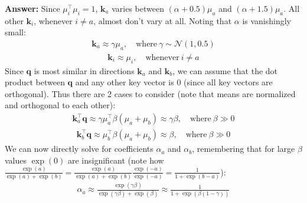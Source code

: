 \documentclass[letterpaper,12pt]{article}
\begin{document}
\begin{itemize}
		\textcolor{blue!70}{\textbf{Answer:} Since $\mu_i^\top\mu_i = 1$, $\mathbf{k}_a$ varies between $(\alpha + 0.5)\mu_a$ and $(\alpha + 1.5)\mu_a$. All other $\mathbf{k}_i$, whenever $i \neq a$, almost don't vary at all. Noting that $\alpha$ is vanishingly small:
		\begin{equation*}
			\begin{aligned}
				\mathbf{k}_a \approx \gamma \mu_a, \quad \text{where} \ \gamma \sim \mathcal{N}(1,0.5)
			\end{aligned}
		\end{equation*}
		\begin{equation*}
			\begin{aligned}
				\mathbf{k}_i \approx \mu_i, \quad \text{whenever} \ i \neq a
			\end{aligned}
		\end{equation*}
		Since $\mathbf{q}$ is most similar in directions $\mathbf{k}_a$ and $\mathbf{k}_b$, we can assume that the dot product between $\mathbf{q}$ and any other key vector is 0 (since all key vectors are orthogonal). Thus there are 2 cases to consider (note that means are normalized and orthogonal to each other):
		\begin{equation*}
			\begin{aligned}
				\mathbf{k}_a^\top \mathbf{q} \approx \gamma \mu_a^\top \beta \left( \mu_a + \mu_b \right) \approx \gamma \beta, \quad \text{where} \ \beta \gg 0
			\end{aligned}
		\end{equation*}
		\begin{equation*}
			\begin{aligned}
				\mathbf{k}_b^\top \mathbf{q} \approx \mu_b^\top \beta \left( \mu_a + \mu_b \right) \approx \beta, \quad \text{where} \ \beta \gg 0
			\end{aligned}
		\end{equation*}
		We can now directly solve for coefficients $\alpha_a$ and $\alpha_b$, remembering that for large $\beta$ values $\exp(0)$ are insignificant (note how $\frac{\exp(a)}{\exp(a)+\exp(b)} = \frac{\exp(a)}{\exp(a)+\exp(b)}\frac{\exp(-a)}{\exp(-a)}=\frac{1}{1+\exp(b-a)}$):
		\begin{equation*}
			\begin{aligned}
				\alpha_a \approx \frac{\exp(\gamma \beta)}{\exp(\gamma \beta) + \exp(\beta)} \approx \frac{1}{1+\exp(\beta(1-\gamma))}
			\end{aligned}
		\end{equation*}
		\begin{equation*}

\end{equation*}}
\end{itemize}
\end{document}
